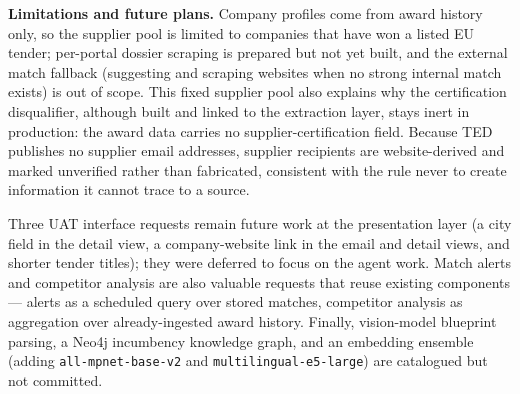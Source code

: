 \textbf{Limitations and future plans.} Company profiles come from award history only,
so the supplier pool is limited to companies that have won a listed EU tender;
per-portal dossier scraping is prepared but not yet built, and the external match
fallback (suggesting and scraping websites when no strong internal match exists) is
out of scope. This fixed supplier pool also explains why the certification
disqualifier, although built and linked to the extraction layer, stays inert in
production: the award data carries no supplier-certification field. Because TED
publishes no supplier email addresses, supplier recipients are website-derived and
marked unverified rather than fabricated, consistent with the rule never to create
information it cannot trace to a source.

Three UAT interface requests remain future work at the presentation layer (a city
field in the detail view, a company-website link in the email and detail views, and
shorter tender titles); they were deferred to focus on the agent work. Match alerts
and competitor analysis are also valuable requests that reuse existing components ---
alerts as a scheduled query over stored matches, competitor analysis as aggregation
over already-ingested award history. Finally, vision-model blueprint parsing, a Neo4j
incumbency knowledge graph, and an embedding ensemble (adding \texttt{all-mpnet-base-v2}
and \texttt{multilingual-e5-large}) are catalogued but not committed.

